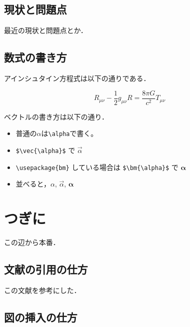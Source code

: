 \documentclass[a4paper,11pt,uplatex]{ujreport}
\begin{document}
\section{現状と問題点}
\label{sec:現状と問題点}

最近の現状と問題点とか．\par

\section{数式の書き方}
\label{sec:数式の書き方}

アインシュタイン方程式は以下の通りである．\par

\begin{equation}
  R_{\mu\nu} - \frac{1}{2} g_{\mu\nu} R = \frac{8\pi G}{c^2} T_{\mu\nu}
\end{equation}

ベクトルの書き方は以下の通り．\par

\begin{itemize}
  \item 普通の$\alpha$は\verb|\alpha|で書く。
  \item \verb|$\vec{\alpha}$| で $\vec{\alpha}$
  \item \verb|\usepackage{bm}| している場合は
        \verb|$\bm{\alpha}$| で $\bm{\alpha}$
  \item 並べると，$\alpha$, $\vec{\alpha}$, $\bm{\alpha}$
\end{itemize}

\chapter{つぎに}
\label{chap:つぎに}

この辺から本番．\par

\section{文献の引用の仕方}
\label{sec:分権の引用の仕方}

この文献\cite{LaTexWiki,渡辺豊2016}を参考にした．\par

\section{図の挿入の仕方}
\label{sec:図の挿入の仕方}
\end{document}
